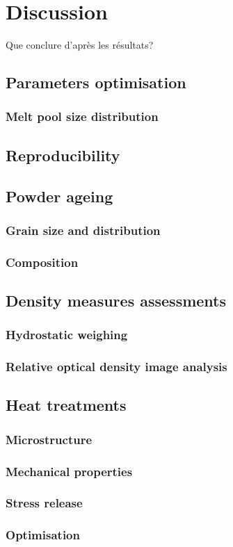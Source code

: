 \chapter{Discussion}
\label{Chap5}
Que conclure d'après les résultats?

\section{Parameters optimisation}


\subsection{Melt pool size distribution}

\section{Reproducibility}

\section{Powder ageing}
\subsection{Grain size and distribution}
\subsection{Composition}

\section{Density measures assessments}
\subsection{Hydrostatic weighing}

\subsection{Relative optical density image analysis}

\section{Heat treatments}
\subsection{Microstructure}

\subsection{Mechanical properties}

\subsection{Stress release}

\subsection{Optimisation}



